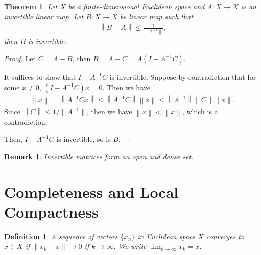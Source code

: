 \documentclass[10pt]{book}
\newtheorem{definition}{Definition}[chapter]
\newtheorem{theorem}{Theorem}[chapter]
\newtheorem{remark}{Remark}[chapter]
\theoremstyle{definition}
\numberwithin{equation}{chapter}
\begin{document}
\medskip

\begin{theorem}
Let $X$ be a finite-dimensional Euclidean space and $A:X\to X$ is an invertible linear map. Let $B:X\to X$ be linear map such that 
\begin{align*}
    \left\|B - A\right\| \leq \frac{1}{\|A^{-1}\|},
\end{align*}
then $B$ is invertible.
\end{theorem}
\begin{proof}
Let $C = A - B$, then $B = A - C = A\left(I - A^{-1}C\right)$. 

It suffices to show that $I - A^{-1}C$ is invertible. Suppose by contradiction that for some $x\neq 0$, $\left(I - A^{-1}C\right)x = 0$. Then we have
\begin{align*}
    \left\|x\right\| = \left\|A^{-1}C x\right\| \leq \left\|A^{-1}C\right\| \left\|x\right\| \leq \left\|A^{-1}\right\| \|C\| \|x\|.
\end{align*}
Since $\left\|C\right\| \leq 1 / \|A^{-1}\|$, then we have $\left\|x\right\| < \left\|x\right\|$, which is a contradiction. 

Then, $I - A^{-1}C$ is invertible, so is $B$.
\end{proof}

\begin{remark}
Invertible matrices form an open and dense set.
\end{remark}

\medskip

\section{Completeness and Local Compactness}

\begin{definition}
A sequence of vectors $\{x_n\}$ in Euclidean space $X$ converges to $x\in X$ if $\|x_k - x\| \to 0$ if $k\to \infty$. We write $\lim_{k\to\infty}x_k = x$.
\end{definition}

\medskip
\end{document}

